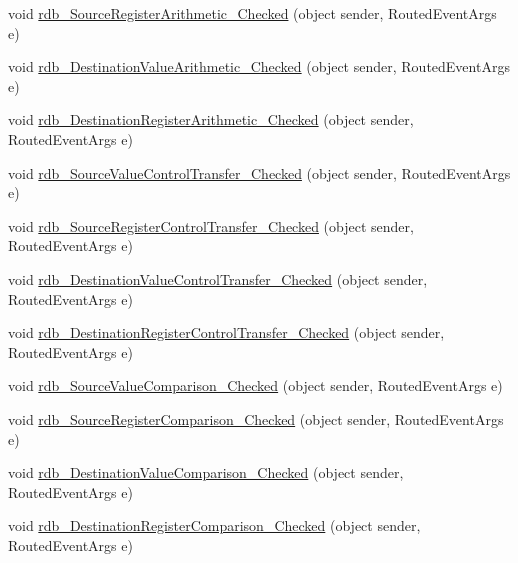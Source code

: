 \begin{DoxyCompactItemize}
void \hyperlink{class_c_p_u___o_s___simulator_1_1_instructions_window_aed7531afdb080427f98bc26b5488fd18}{rdb\+\_\+\+Source\+Register\+Arithmetic\+\_\+\+Checked} (object sender, Routed\+Event\+Args e)
\item 
void \hyperlink{class_c_p_u___o_s___simulator_1_1_instructions_window_a41782c6995180cad160c5e8f46ce5739}{rdb\+\_\+\+Destination\+Value\+Arithmetic\+\_\+\+Checked} (object sender, Routed\+Event\+Args e)
\item 
void \hyperlink{class_c_p_u___o_s___simulator_1_1_instructions_window_a4625e511a95aa3cce6550f2b0fd60aea}{rdb\+\_\+\+Destination\+Register\+Arithmetic\+\_\+\+Checked} (object sender, Routed\+Event\+Args e)
\item 
void \hyperlink{class_c_p_u___o_s___simulator_1_1_instructions_window_a05f9924f69791130e674933886386965}{rdb\+\_\+\+Source\+Value\+Control\+Transfer\+\_\+\+Checked} (object sender, Routed\+Event\+Args e)
\item 
void \hyperlink{class_c_p_u___o_s___simulator_1_1_instructions_window_a6f9bce58d8e409879131619b7316b990}{rdb\+\_\+\+Source\+Register\+Control\+Transfer\+\_\+\+Checked} (object sender, Routed\+Event\+Args e)
\item 
void \hyperlink{class_c_p_u___o_s___simulator_1_1_instructions_window_a308ca537f9fb659b301b92c426840088}{rdb\+\_\+\+Destination\+Value\+Control\+Transfer\+\_\+\+Checked} (object sender, Routed\+Event\+Args e)
\item 
void \hyperlink{class_c_p_u___o_s___simulator_1_1_instructions_window_a0abcc3b1c9dbbc04379f35bfc645b58b}{rdb\+\_\+\+Destination\+Register\+Control\+Transfer\+\_\+\+Checked} (object sender, Routed\+Event\+Args e)
\item 
void \hyperlink{class_c_p_u___o_s___simulator_1_1_instructions_window_aa5413c4f240c448298867dfca5474d52}{rdb\+\_\+\+Source\+Value\+Comparison\+\_\+\+Checked} (object sender, Routed\+Event\+Args e)
\item 
void \hyperlink{class_c_p_u___o_s___simulator_1_1_instructions_window_a21a7262f1fc85de3f833bc1a88e1b384}{rdb\+\_\+\+Source\+Register\+Comparison\+\_\+\+Checked} (object sender, Routed\+Event\+Args e)
\item 
void \hyperlink{class_c_p_u___o_s___simulator_1_1_instructions_window_a8d499408578787c03f1e8ce58db03506}{rdb\+\_\+\+Destination\+Value\+Comparison\+\_\+\+Checked} (object sender, Routed\+Event\+Args e)
\item 
void \hyperlink{class_c_p_u___o_s___simulator_1_1_instructions_window_afacc5e2bbf9eae3af4d00a65824ac22d}{rdb\+\_\+\+Destination\+Register\+Comparison\+\_\+\+Checked} (object sender, Routed\+Event\+Args e)

\end{DoxyCompactItemize}
